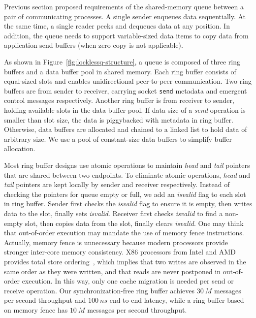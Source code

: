 Previous section proposed requirements of the shared-memory queue between a pair of communicating processes. A single sender enqueues data sequentially. At the same time, a single reader peeks and dequeues data at any position. In addition, the queue needs to support variable-sized data items to copy data from application send buffers (when zero copy is not applicable).

As shown in Figure~\ref{fig:locklessq-structure}, a queue is composed of three ring buffers and a data buffer pool in shared memory. Each ring buffer consists of equal-sized slots and enables unidirectional peer-to-peer communication. Two ring buffers are from sender to receiver, carrying socket \texttt{send} metadata and emergent control messages respectively. Another ring buffer is from receiver to sender, holding available slots in the data buffer pool. If data size of a \textit{send} operation is smaller than slot size, the data is piggybacked with metadata in ring buffer. Otherwise, data buffers are allocated and chained to a linked list to hold data of arbitrary size. We use a pool of constant-size data buffers to simplify buffer allocation.

Most ring buffer designs use atomic operations to maintain \textit{head} and \textit{tail} pointers that are shared between two endpoints. To eliminate atomic operations, \textit{head} and \textit{tail} pointers are kept locally by sender and receiver respectively. Instead of checking the pointers for queue empty or full, we add an \textit{isvalid} flag to each slot in ring buffer. Sender first checks the \textit{isvalid} flag to ensure it is empty, then writes data to the slot, finally sets \textit{isvalid}. Receiver first checks \textit{isvalid} to find a non-empty slot, then copies data from the slot, finally clears \textit{isvalid}. One may think that out-of-order execution may mandate the use of memory fence instructions. Actually, memory fence is unnecessary because modern processors provide stronger inter-core memory consistency. X86 processors from Intel and AMD provides total store ordering~\cite{sewell2010x86,intel-manual}, which implies that two writes are observed in the same order as they were written, and that reads are never postponed in out-of-order execution. In this way, only one cache migration is needed per send or receive operation. Our synchronization-free ring buffer achieves $30~M$ messages per second throughput and $100~ns$ end-to-end latency, while a ring buffer based on memory fence has $10~M$ messages per second throughput.


